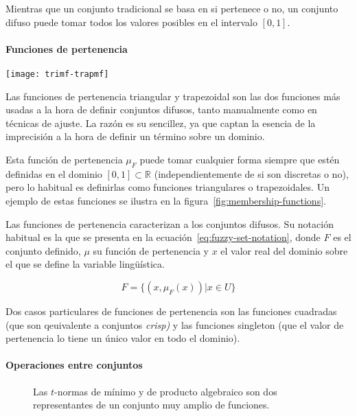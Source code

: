 Mientras que un conjunto tradicional se basa en si pertenece o no, un conjunto difuso puede tomar todos los valores posibles en el intervalo $[0, 1]$.

\paragraph{Funciones de pertenencia}

\begin{marginfigure}
	\centering
	\texttt{[image: trimf-trapmf]}
	\caption[Gráfica de funciones de pertenencia triangular y trapezoidal.]{Las funciones de pertenencia triangular y trapezoidal son las dos funciones más usadas a la hora de definir conjuntos difusos, tanto manualmente como en técnicas de ajuste. La razón es su sencillez, ya que captan la esencia de la imprecisión a la hora de definir un término sobre un dominio.}
	\label{fig:trimf-trapmf}
\end{marginfigure}

Esta función de pertenencia $\mu_F$ puede tomar cualquier forma siempre que estén definidas en el dominio $[0, 1] \subset \mathbb{R}$ (independientemente de si son discretas o no), pero lo habitual es definirlas como funciones triangulares o trapezoidales. Un ejemplo de estas funciones se ilustra en la figura~\ref{fig:membership-functions}.

Las funciones de pertenencia caracterizan a los conjuntos difusos. Su notación habitual es la que se presenta en la ecuación~\ref{eq:fuzzy-set-notation}, donde $F$ es el conjunto definido, $\mu$ su función de pertenencia y $x$ el valor real del dominio sobre el que se define la variable lingüística.

\begin{equation}
	F = \{(x, \mu_F(x)) | x \in U\}
\end{equation}

Dos casos particulares de funciones de pertenencia son las funciones cuadradas (que son qeuivalente a conjuntos \textit{crisp)} y las funciones singleton (que el valor de pertenencia lo tiene un único valor en todo el dominio).

\paragraph{Operaciones entre conjuntos}

\begin{figure}[!b]
	\centering
	\caption[$t$-normas del mínimo y del producto algebraico.]{Las $t$-normas de mínimo y de producto algebraico son dos representantes de un conjunto muy amplio de funciones.}
	\label{fig:t-norms}
\end{figure}

